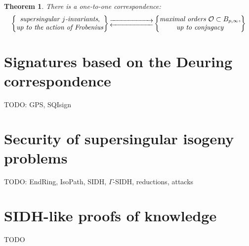 \documentclass[10pt]{article}
\theoremstyle{plain}
\newtheorem{theorem}{Theorem}
\theoremstyle{definition}
\def\O{\ensuremath{\mathcal{O}}}
\begin{document}
\begin{theorem}
There is a one-to-one correspondence:
    \begin{equation*}
        \left\{
            \begin{tabular}{@{} c @{}}
                \emph{supersingular $j$-invariants}, \\
                \emph{up to the action of Frobenius}
            \end{tabular}
        \right\}
        \begin{gathered}
            \overset{}{\xrightarrow{\hspace*{2cm}}} \\[-2ex]
            \underset{}{\xleftarrow{\hspace*{2cm}}}
        \end{gathered}
        \left\{
            \begin{tabular}{@{} c @{}}
                \emph{maximal orders $\O\subset B_{p,\infty}$}, \\
                \emph{up to conjugacy}
            \end{tabular}
        \right\}
    \end{equation*}
\end{theorem}


\section{Signatures based on the Deuring correspondence}
\label{sec:sqisign}

TODO: GPS, SQIsign


\section{Security of supersingular isogeny problems}
\label{sec:security}

TODO: EndRing, IsoPath, SIDH, $Γ$-SIDH, reductions, attacks

\section{SIDH-like proofs of knowledge}
\label{sec:sidh-poks}

TODO


\clearpage
{}


\end{document}
